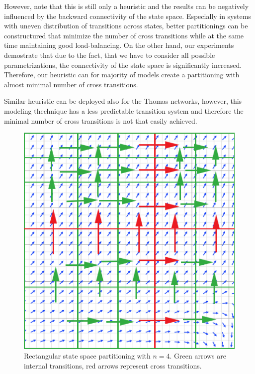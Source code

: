\documentclass[12pt,oneside, draft]{fithesis2}
\begin{document}
			However, note that this is still only a heuristic and the results can be negatively influenced by the backward connectivity of the state space. Especially in systems with uneven distribution of transitions across states, better partitionings can be constructured that minimize the number of cross transitions while at the same time maintaining good load-balancing. On the other hand, our experiments demostrate that due to the fact, that we have to consider all possible parametrizations, the connectivity of the state space is significantly increased. Therefore, our heuristic can for majority of models create a partitioning with almost minimal number of cross transitions. 
			
			Similar heuristic can be deployed also for the Thomas networks, however, this modeling thechnique has a less predictable transition system and therefore the minimal number of cross transitions is not that easily achieved. 
			

\begin{figure}
\begin{center}
\includegraphics[scale=.40]{trans.png}
\end{center}
\vspace*{-0.5em}
\caption{Rectangular state space partitioning with $n = 4$. Green arrows are internal transitions, red arrows represent cross transitions.}
\label{fig:3dresults}
\end{figure}			
		
\end{document}
